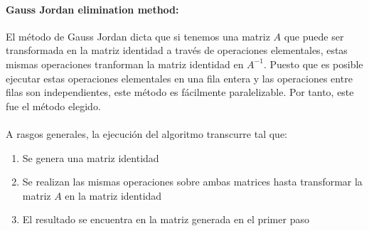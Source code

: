 \paragraph{Gauss Jordan elimination method:}
El método de Gauss Jordan dicta que si tenemos una matriz $A$ que puede ser transformada en la matriz identidad a través de operaciones elementales, estas mismas operaciones tranforman la matriz identidad en $A^{-1}$. Puesto que es posible ejecutar estas operaciones elementales en una fila entera y las operaciones entre filas son independientes, este método es fácilmente paralelizable.
Por tanto, este fue el método elegido.
\\
\\
A rasgos generales, la ejecución del algoritmo transcurre tal que:
\begin{enumerate}
\item Se genera una matriz identidad
\item Se realizan las mismas operaciones sobre ambas matrices hasta transformar la matriz $A$ en la matriz identidad
\item El resultado se encuentra en la matriz generada en el primer paso
\end{enumerate}

